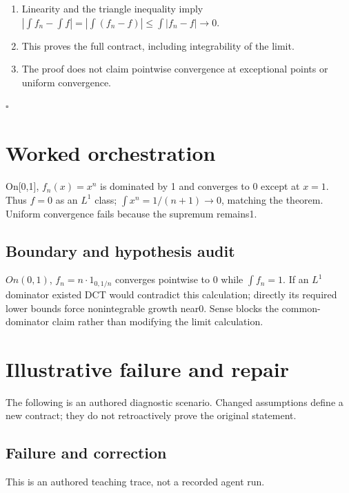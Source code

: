 \documentclass[preprint,12pt,aps,pra,showkeys,amsmath,amssymb,superscriptaddress,floatfix]{revtex4-2}
\theoremstyle{definition}
\theoremstyle{remark}
\begin{document}
\begin{enumerate}
\def\labelenumi{\arabic{enumi}.}
\item
  Linearity and the triangle inequality imply
  \(|\int f_n-\int f|=|\int (f_n-f)|\le \int |f_n-f|\to 0\).
\item
  This proves the full contract, including integrability of the limit.
\item
  The proof does not claim pointwise convergence at exceptional points
  or uniform convergence.
\end{enumerate}

\hfill$\square$

\section{Worked orchestration}

On{[}0,1{]}, \(f_n(x)=x^{n}\) is dominated by 1 and converges to 0
except at \(x=1\). Thus \(f=0\) as an \(L^{1}\) class;
\(\int x^{n}=1/(n+1)\to 0\), matching the theorem. Uniform convergence
fails because the supremum remains1.

\subsection{Boundary and hypothesis audit}

\(On(0,1)\), \(f_n=n\cdot 1_{0,1/n}\) converges pointwise to 0 while
\(\int f_n=1\). If an \(L^{1}\) dominator existed DCT would contradict
this calculation; directly its required lower bounds force nonintegrable
growth near0. Sense blocks the common-dominator claim rather than
modifying the limit calculation.

\section{Illustrative failure and repair}

The following is an authored diagnostic scenario. Changed assumptions
define a new contract; they do not retroactively prove the original
statement.

\subsection{Failure and correction}
This is an authored teaching trace, not a recorded agent run.
\end{document}
